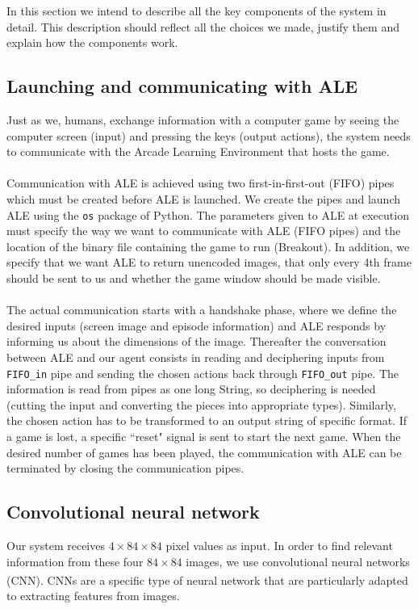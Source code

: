 \documentclass[a4paper,12pt]{article}
\begin{document}
In this section we intend to describe all the key components of the system in detail. This description should reflect all the choices we made, justify them and explain how the components work.



\subsection{Launching and communicating with ALE}
Just as we, humans, exchange information with a computer game by seeing the computer screen (input) and pressing the keys (output actions), the system needs to communicate with the Arcade Learning Environment that hosts the game.
\paragraph{}
Communication with ALE is achieved using two first-in-first-out (FIFO) pipes which must be created before ALE is launched. We create the pipes and launch ALE using the \verb=os= package of Python. The parameters given to ALE at execution must specify the way we want to communicate with ALE (FIFO pipes) and the location of the binary file containing the game to run (Breakout). In addition, we specify that we want ALE to return unencoded images, that only every 4th frame should be sent to us and whether the game window should be made visible.


\paragraph{}
The actual communication starts with a handshake phase, where we define the desired inputs (screen image and episode information) and ALE responds by informing us about the dimensions of the image. Thereafter the conversation between ALE and our agent consists in reading and deciphering inputs from \texttt{FIFO\_in} pipe and sending the chosen actions back through \texttt{FIFO\_out} pipe. The information is read from pipes as one long String, so deciphering is needed (cutting the input and converting the pieces into appropriate types). Similarly, the chosen action has to be transformed to an output string of specific format. If a game is lost, a specific ``reset" signal is sent to start the next game. When the desired number of games has been played, the communication with ALE can be terminated by closing the communication pipes. 



\subsection{Convolutional neural network}
Our system receives $4 \times 84 \times 84$ pixel values as input. In order to find relevant information from these four $84 \times 84$ images, we use convolutional neural networks (CNN)\textsuperscript{\cite{lecun1995convolutional}}. CNNs are a specific type of neural network that are particularly adapted to extracting features from images.
\end{document}
